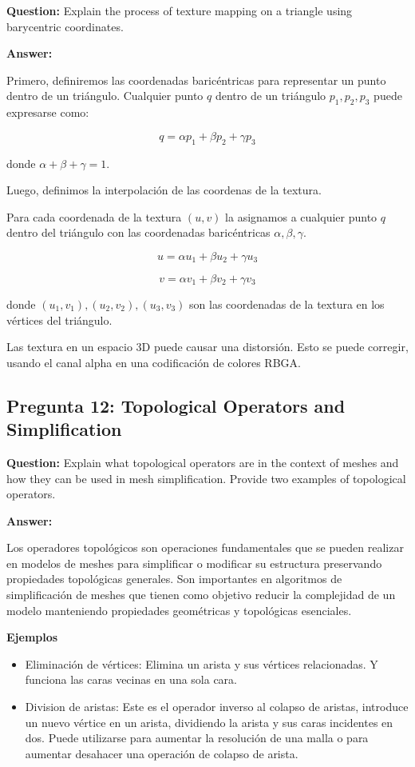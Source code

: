 \documentclass{article}
\begin{document}
\textbf{Question:} Explain the process of texture mapping on a triangle using barycentric coordinates.

\textbf{Answer:}

Primero, definiremos las coordenadas baricéntricas para representar un punto dentro de un triángulo. Cualquier punto $q$ dentro de un triángulo $p_1, p_2, p_3$ puede expresarse como:

\[
q = \alpha p_1 + \beta p_2 + \gamma p_3
\]

donde $\alpha + \beta + \gamma = 1$.

Luego, definimos la interpolación de las coordenas de la textura.

Para cada coordenada de la textura $(u,v)$ la asignamos a cualquier punto $q$ dentro del triángulo con las coordenadas baricéntricas $\alpha, \beta, \gamma$.

\[
u = \alpha u_1 + \beta u_2 + \gamma u_3
\]

\[
v = \alpha v_1 + \beta v_2 + \gamma v_3
\]

donde $(u_1, v_1), (u_2, v_2), (u_3, v_3)$ son las coordenadas de la textura en los vértices del triángulo.

Las textura en un espacio 3D puede causar una distorsión. Esto se puede corregir, usando el canal alpha en una codificación de colores RBGA.

\subsection{Pregunta 12: Topological Operators and Simplification}

\textbf{Question:} Explain what topological operators are in the context of meshes and how they can be used in mesh simplification. Provide two examples of topological operators.

\textbf{Answer:}

Los operadores topológicos son operaciones fundamentales que se pueden realizar en modelos de meshes para simplificar o modificar su estructura preservando propiedades topológicas generales.
Son importantes en algoritmos de simplificación de meshes que tienen como objetivo reducir la complejidad de un modelo manteniendo propiedades geométricas y topológicas esenciales.

\textbf{Ejemplos}

\begin{itemize}
    \item Eliminación de vértices: Elimina un arista y sus vértices relacionadas. Y funciona las caras vecinas en una sola cara.
    \item Division de aristas: Este es el operador inverso al colapso de aristas, introduce un nuevo vértice en un arista, dividiendo la arista y sus caras incidentes en dos. Puede utilizarse para aumentar la resolución de una malla o para aumentar desahacer una operación de colapso de arista.
\end{itemize}
\end{document}
